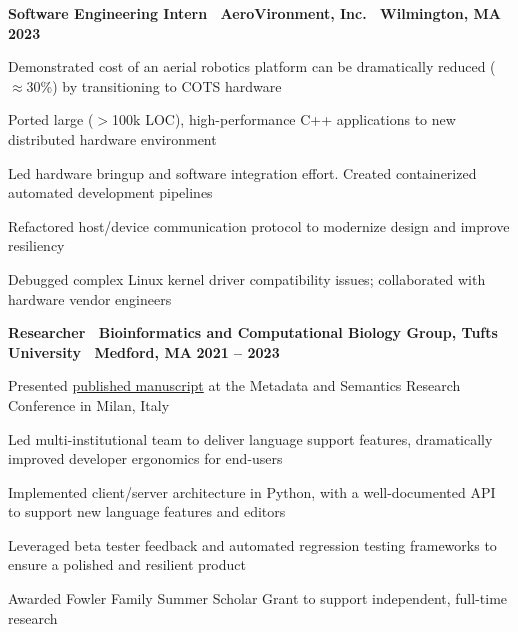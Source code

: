 \documentclass[10pt]{article}
\newenvironment{mylist}[1][]
{\itemize[nosep, wide=0pt, leftmargin=*, after=\strut]}
{\enditemize}
\begin{document}
\begin{minipage}[t]{\linewidth}
    \textbf{Software Engineering Intern \textbar \ AeroVironment, Inc. \textbar \ Wilmington, MA} \hfill \textbf{2023} 
    \begin{mylist}
        \item Demonstrated cost of an aerial robotics platform can be dramatically reduced ($\approx$30\%) by transitioning to COTS hardware
        \item Ported large ($>$100k LOC), high-performance C++ applications to new distributed hardware environment
        \item Led hardware bringup and software integration effort. Created containerized automated development pipelines
        \item Refactored host/device communication protocol to modernize design and improve resiliency
        \item Debugged complex Linux kernel driver compatibility issues; collaborated with hardware vendor engineers
    \end{mylist}
\end{minipage}

\begin{minipage}[t]{\linewidth}
    \textbf{Researcher \textbar \ Bioinformatics and Computational Biology Group, Tufts University \textbar \ Medford, MA} \hfill \textbf{2021 -- 2023}
    \begin{mylist}
        \item Presented \href{https://link.springer.com/chapter/10.1007/978-3-031-65990-4_25}{published manuscript} at the Metadata and Semantics Research Conference in Milan, Italy
        \item Led multi-institutional team to deliver language support features, dramatically improved developer ergonomics for end-users
        \item Implemented client/server architecture in Python, with a well-documented API to support new language features and editors
        \item Leveraged beta tester feedback and automated regression testing frameworks to ensure a polished and resilient product
        \item Awarded Fowler Family Summer Scholar Grant to support independent, full-time research
    \end{mylist}
\end{minipage}
\end{document}

